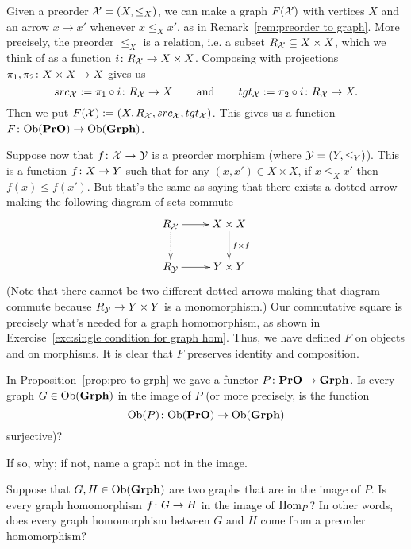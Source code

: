 \documentclass[CT4S-EN-RU]{subfiles}
\begin{document}
\begin{propositionRUS}\label{prop:pro to grph}
\end{propositionRUS}

\begin{proofENG}
Given a preorder $\mathcal{X}=(X,\leq_X)$, we can make a graph $F(\mathcal{X})$ with vertices $X$ and an arrow $x\to x'$ whenever $x\leq_X x'$, as in Remark~\ref{rem:preorder to graph}. More precisely, the preorder $\leq_X$ is a relation, i.e. a subset $R_\mathcal{X}\subseteq X\times X$, which we think of as a function $i\colon R_\mathcal{X}\rightarrow X\times X$. Composing with projections $\pi_1,\pi_2\colon X\times X\rightarrow X$ gives us $$src_\mathcal{X}:=\pi_1\circ i\colon R_\mathcal{X}\rightarrow X\hspace{.3in}\textnormal{and}\hspace{.3in} tgt_\mathcal{X}:=\pi_2\circ i\colon R_\mathcal{X}\rightarrow X.$$ Then we put $F(\mathcal{X}):=(X,R_\mathcal{X},src_\mathcal{X},tgt_\mathcal{X})$. This gives us a function $F\colon\textnormal{Ob}({\mathbf{PrO}})\rightarrow\textnormal{Ob}({\mathbf{Grph}})$.

Suppose now that $f\colon\mathcal{X}\rightarrow\mathcal{Y}$ is a preorder morphism (where $\mathcal{Y}=(Y,\leq_Y)$). This is a function $f\colon X\rightarrow Y$ such that for any $(x,x')\in X\times X$, if $x\leq_X x'$ then $f(x)\leq f(x')$. But that's the same as saying that there exists a dotted arrow making the following diagram of sets commute
$$
\xymatrix{R_\mcX\ar[r]\ar@{..>}[d]&X\times X\ar[d]^{f\times f}\\R_\mcY\ar[r]&Y\times Y
}
$$
(Note that there cannot be two different dotted arrows making that diagram commute because $R_\mathcal{Y}\rightarrow Y\times Y$ is a monomorphism.) 
Our commutative square is precisely what's needed for a graph homomorphism, as shown in Exercise~\ref{exc:single condition for graph hom}. Thus, we have defined $F$ on objects and on morphisms. It is clear that $F$ preserves identity and composition.
\end{proofENG}

\begin{proofRUS}
\end{proofRUS}

\begin{exerciseENG}
In Proposition~\ref{prop:pro to grph} we gave a functor $P\colon{\mathbf{PrO}}\rightarrow{\mathbf{Grph}}$.
\sexc  Is every graph $G\in\textnormal{Ob}({\mathbf{Grph}})$ in the image of $P$ (or more precisely, is the function $$\textnormal{Ob}(P)\colon\textnormal{Ob}({\mathbf{PrO}})\rightarrow\textnormal{Ob}({\mathbf{Grph}})$$ surjective)?
\item If so, why; if not, name a graph not in the image.
\item Suppose that $G, H\in\textnormal{Ob}({\mathbf{Grph}})$ are two graphs that are in the image of $P$. Is every graph homomorphism $f\colon G\rightarrow H$ in the image of $\textnormal{Hom}_P$? In other words, does every graph homomorphism between $G$ and $H$ come from a preorder homomorphism?
\endsexc
\end{exerciseENG}
\end{document}
